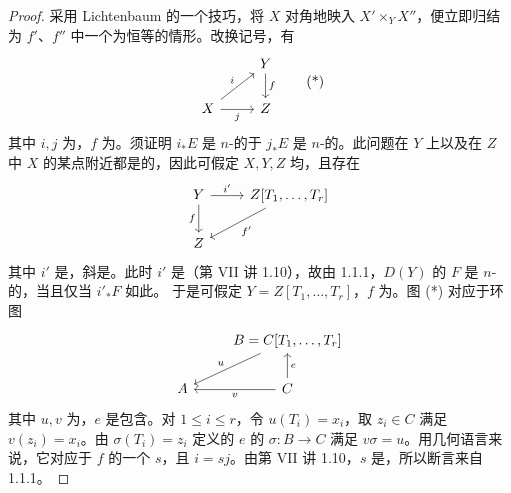 \begin{proof}
采用 Lichtenbaum 的一个技巧，将 $X$ 对角地映入 $X'\times_YX''$，便立即归结为 $f'$、$f''$ 中一个为恒等的情形。改换记号，有
\[
\begin{tikzcd}&Y\arrow[d,"f"]\\X\arrow[ur,"i"]\arrow[r,"j"']&Z\end{tikzcd}\tag{*}
\]
其中 $i,j$ 为，$f$ 为。须证明 $i_*E$ 是 $n$-的于 $j_*E$ 是 $n$-的。此问题在 $Y$ 上以及在 $Z$ 中 $X$ 的某点附近都是的，因此可假定 $X,Y,Z$ 均，且存在
\[
\begin{tikzcd}Y\arrow[r,"i'"]\arrow[d,"f"']&Z[T_1,\ldots,T_r]\arrow[dl,"f'"]\\Z&\end{tikzcd}
\]
其中 $i'$ 是，斜是。此时 $i'$ 是（第 VII 讲 1.10），故由 1.1.1，$D(Y)$ 的 $F$ 是 $n$-的，当且仅当 $i'_*F$ 如此。
于是可假定 $Y=Z[T_1,\ldots,T_r]$，$f$ 为。图 (*) 对应于环图
\[
\begin{tikzcd}&B=C[T_1,\ldots,T_r]\arrow[dl,"u"']\\A&C\arrow[l,"v"]\arrow[u,"e"']\end{tikzcd}
\]
其中 $u,v$ 为，$e$ 是包含。对 $1\le i\le r$，令 $u(T_i)=x_i$，取 $z_i\in C$ 满足 $v(z_i)=x_i$。由 $\sigma(T_i)=z_i$ 定义的 $e$ 的 $\sigma:B\to C$ 满足 $v\sigma=u$。用几何语言来说，它对应于 $f$ 的一个 $s$，且 $i=sj$。由第 VII 讲 1.10，$s$ 是，所以断言来自 1.1.1。
\end{proof}
